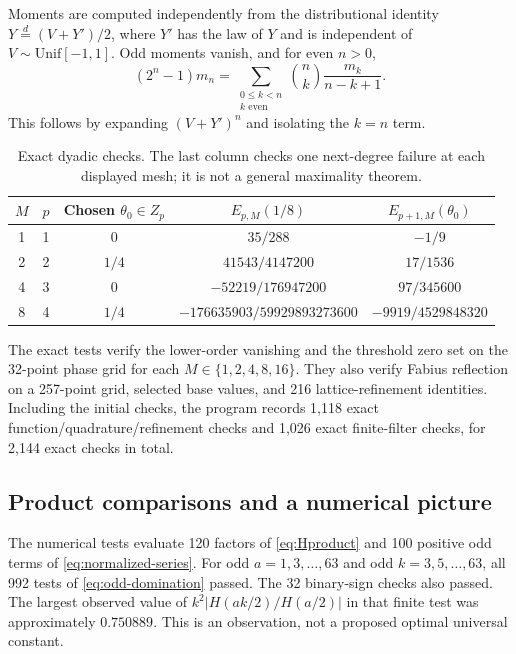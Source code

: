 \documentclass[11pt,a4paper]{article}
\numberwithin{equation}{section}
\theoremstyle{plain}
\theoremstyle{definition}
\theoremstyle{remark}
\begin{document}
Moments are computed independently from the distributional identity
$Y\overset{d}= (V+Y')/2$, where $Y'$ has the law of $Y$ and is independent
of $V\sim\mathrm{Unif}[-1,1]$. Odd moments vanish, and for even $n>0$,
\begin{equation}\label{eq:momentrec}
 (2^n-1)m_n=\sum_{\substack{0\le k<n\\k\text{ even}}}
 \binom nk\frac{m_k}{n-k+1}.
\end{equation}
This follows by expanding $(V+Y')^n$ and isolating the $k=n$ term.

\begin{table}[htbp]
\centering
\caption{Exact dyadic checks. The last column checks one next-degree
failure at each displayed mesh; it is not a general maximality theorem.}
\label{tab:exact}
\renewcommand{\arraystretch}{1.35}
\begin{tabular}{@{}ccccc@{}}
\toprule
$M$ & $p$ & Chosen $\theta_0\in Z_p$ & $E_{p,M}(1/8)$ & $E_{p+1,M}(\theta_0)$\\
\midrule
1 & 1 & $0$ & $35/288$ & $-1/9$\\
2 & 2 & $1/4$ & $41543/4147200$ & $17/1536$\\
4 & 3 & $0$ & $-52219/176947200$ & $97/345600$\\
8 & 4 & $1/4$ & $-176635903/59929893273600$ & $-9919/4529848320$\\
\bottomrule
\end{tabular}
\end{table}

The exact tests verify the lower-order vanishing and the threshold zero
set on the 32-point phase grid for each $M\in\{1,2,4,8,16\}$. They also
verify Fabius reflection on a 257-point grid, selected base values, and
216 lattice-refinement identities. Including the initial checks, the
program records 1,118 exact function/quadrature/refinement checks and
1,026 exact finite-filter checks, for 2,144 exact checks in total.

\subsection{Product comparisons and a numerical picture}

The numerical tests evaluate 120 factors of \eqref{eq:Hproduct} and
100 positive odd terms of \eqref{eq:normalized-series}. For odd
$a=1,3,\ldots,63$ and odd $k=3,5,\ldots,63$, all 992 tests of
\eqref{eq:odd-domination} passed. The 32 binary-sign checks also passed.
The largest observed value of
$k^2|H(ak/2)/H(a/2)|$ in that finite test was approximately $0.750889$.
This is an observation, not a proposed optimal universal constant.
\end{document}
